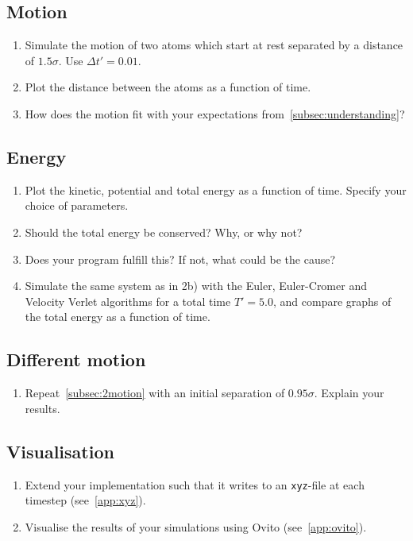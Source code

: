 \documentclass[11pt,british,a4paper]{report}
\begin{document}
\subsection{Motion}\label{subsec:2motion}
\begin{enumerate}[label=\roman*.]
    \item Simulate the motion of two atoms which start at rest separated by a distance of \(\num{1.5}\sigma\). Use \(\Delta t'=\num{0.01}\).
    \item Plot the distance between the atoms as a function of time.
    \item How does the motion fit with your expectations from~\vref{subsec:understanding}?
\end{enumerate}

\subsection{Energy}
\begin{enumerate}[label=\roman*.]
    \item Plot the kinetic, potential and total energy as a function of time. Specify your choice of parameters.
    \item Should the total energy be conserved? Why, or why not?
    \item Does your program fulfill this? If not, what could be the cause?
    \item Simulate the same system as in 2b) with the Euler, Euler-Cromer and Velocity Verlet algorithms for a total time \(T' = 5.0\), and compare graphs of the total energy as a function of time.
\end{enumerate}

\subsection{Different motion}
\begin{enumerate}[label=\roman*.]
    \item Repeat~\vref{subsec:2motion} with an initial separation of \(\num{0.95}\sigma\). Explain your results.
\end{enumerate}

\subsection{Visualisation}
\begin{enumerate}[label=\roman*.]
    \item Extend your implementation such that it writes to an \texttt{xyz}-file at each timestep (see~\vref{app:xyz}).
    \item Visualise the results of your simulations using Ovito (see~\vref{app:ovito}).
\end{enumerate}
\end{document}
